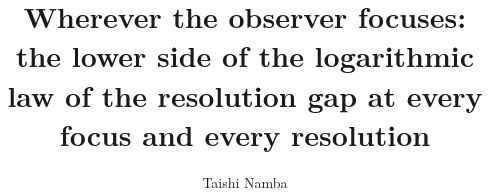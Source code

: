 \documentclass[aps,pre,twocolumn,superscriptaddress,nofootinbib]{revtex4-2}
\begin{document}
\title{\texorpdfstring{Wherever the observer focuses:\\ the lower side of the logarithmic law of the resolution gap at every focus and every resolution}{Wherever the observer focuses: the lower side of the logarithmic law of the resolution gap at every focus and every resolution}}

\author{Taishi Namba}

\begin{abstract}

\end{abstract}

\maketitle














\appendix







\end{document}
